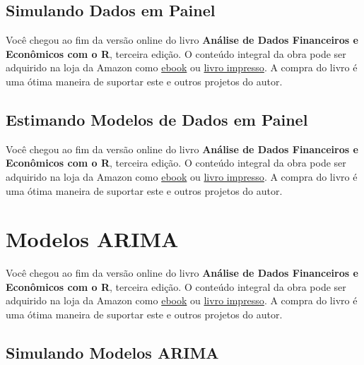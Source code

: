 \documentclass[
  11pt,
]{book}
\newenvironment{pleasebuyit}
{\begin{noteblock}
		
	} {\end{noteblock}}
\begin{document}
\hypertarget{simulando-dados-em-painel}{%
\subsection{Simulando Dados em Painel}\label{simulando-dados-em-painel}}

\begin{pleasebuyit}
Você chegou ao fim da versão online do livro \textbf{Análise de Dados
Financeiros e Econômicos com o R}, terceira edição. O conteúdo integral
da obra pode ser adquirido na loja da Amazon como
\href{https://www.amazon.com.br/dp/B08WNC27ZY}{ebook} ou
\href{https://www.amazon.com/dp/B08WP8CCDB}{livro impresso}. A compra do
livro é uma ótima maneira de suportar este e outros projetos do autor.
\end{pleasebuyit}

\hypertarget{estimando-modelos-de-dados-em-painel}{%
\subsection{Estimando Modelos de Dados em Painel}\label{estimando-modelos-de-dados-em-painel}}

\begin{pleasebuyit}
Você chegou ao fim da versão online do livro \textbf{Análise de Dados
Financeiros e Econômicos com o R}, terceira edição. O conteúdo integral
da obra pode ser adquirido na loja da Amazon como
\href{https://www.amazon.com.br/dp/B08WNC27ZY}{ebook} ou
\href{https://www.amazon.com/dp/B08WP8CCDB}{livro impresso}. A compra do
livro é uma ótima maneira de suportar este e outros projetos do autor.
\end{pleasebuyit}

\hypertarget{modelos-arima}{%
\section{Modelos ARIMA}\label{modelos-arima}}

\begin{pleasebuyit}
Você chegou ao fim da versão online do livro \textbf{Análise de Dados
Financeiros e Econômicos com o R}, terceira edição. O conteúdo integral
da obra pode ser adquirido na loja da Amazon como
\href{https://www.amazon.com.br/dp/B08WNC27ZY}{ebook} ou
\href{https://www.amazon.com/dp/B08WP8CCDB}{livro impresso}. A compra do
livro é uma ótima maneira de suportar este e outros projetos do autor.
\end{pleasebuyit}

\hypertarget{simulando-modelos-arima}{%
\subsection{Simulando Modelos ARIMA}\label{simulando-modelos-arima}}
\end{document}
